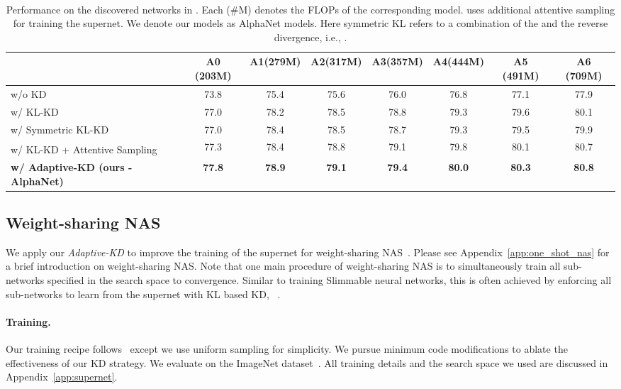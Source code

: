 \documentclass{article}
\begin{document}
\begin{table*}[ht]
    \centering
    \setlength{\tabcolsep}{3pt}
    \begin{tabular}{l|ccccccc}
    \hline 
     & A0 {\scriptsize (203M)}   & A1{\scriptsize (279M)}  & A2{\scriptsize (317M)}  & A3{\scriptsize (357M)} & A4{\scriptsize (444M)}  & A5 {\scriptsize (491M)} & A6 {\scriptsize (709M)}   \\ \hline 
    w/o KD & 73.8 & 75.4 & 75.6 & 76.0 & 76.8 &77.1 &  77.9  \\
    w/ KL-KD & 77.0 & 78.2 & 78.5 &78.8 &79.3 &79.6 & 80.1 \\
    w/ Symmetric KL-KD & 77.0 & 78.4 &  78.5 & 78.7 & 79.3 & 79.5 &  79.9\\
    w/ KL-KD + Attentive Sampling \textsuperscript{} & 77.3 & 78.4 & 78.8 & 79.1 & 79.8 & 80.1 & 80.7 \\ \hline 
    \bf  w/ Adaptive-KD (ours - AlphaNet) &   \bf77.8 & \bf 78.9  & \bf79.1 & \bf 79.4 &\bf 80.0 & \bf 80.3 & \bf 80.8  \\
    \hline  
    \end{tabular}
    \caption{
    Performance on the discovered networks in \citet{wang2020attentivenas}. 
    Each (\#M) denotes the FLOPs of the corresponding model. 
    \textsuperscript{} uses additional attentive sampling \citep{wang2020attentivenas} for training the supernet.
    We denote our models as AlphaNet models. Here symmetric KL refers to a combination of
    the  and the reverse  divergence, i.e., .
    }
    \label{tab:attnas}
\end{table*}

\subsection{Weight-sharing NAS}
\label{sec:exp_supernet}
We apply our \emph{Adaptive-KD} to improve the training of the supernet for weight-sharing NAS~\citep{cai2019once, yu2020bignas, wang2020attentivenas}. Please see Appendix~\ref{app:one_shot_nas} for a brief introduction on weight-sharing NAS. 
Note that one main procedure of weight-sharing NAS is to simultaneously train all sub-networks specified in the search space to convergence. 
Similar to training Slimmable neural networks, 
this is often achieved by enforcing all sub-networks to learn from the supernet with KL based KD, ~\citep[e.g.,][]{yu2020bignas}. 

\paragraph{Training.} 
Our training recipe follows~\citet{wang2020attentivenas} except we use uniform sampling for simplicity. We pursue minimum code modifications to ablate the effectiveness of our KD strategy. 
We evaluate on the ImageNet dataset~\citep{deng2009imagenet}. 
All training details and the search space we used are discussed in Appendix~\ref{app:supernet}.
\end{document}
